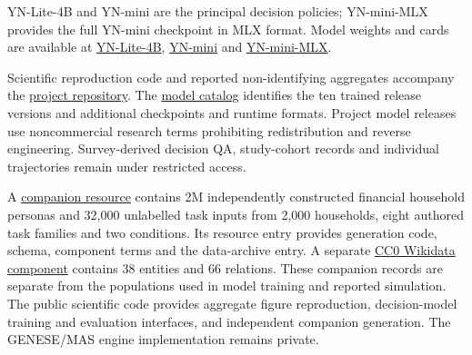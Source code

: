 \documentclass[10pt]{article}
\begin{document}
YN-Lite-4B and YN-mini are the principal decision policies; YN-mini-MLX provides the full YN-mini checkpoint in MLX format. Model weights and cards are available at \href{https://huggingface.co/ya9919/sharp-4b}{YN-Lite-4B}, \href{https://huggingface.co/ya9919/sharp-421m}{YN-mini} and \href{https://huggingface.co/ya9919/sharp-421m-mlx}{YN-mini-MLX}.


Scientific reproduction code and reported non-identifying aggregates accompany the \href{https://github.com/KataDavidXD/s2-mas}{project repository}. The \href{https://github.com/KataDavidXD/s2-mas/blob/main/resources/MODEL_CATALOG.md}{model catalog} identifies the ten trained release versions and additional checkpoints and runtime formats. Project model releases use noncommercial research terms prohibiting redistribution and reverse engineering. Survey-derived decision QA, study-cohort records and individual trajectories remain under restricted access.

A \href{https://github.com/KataDavidXD/s2-mas/tree/main/resources/public_companion}{companion resource} contains 2M independently constructed financial household personas and 32,000 unlabelled task inputs from 2,000 households, eight authored task families and two conditions. Its resource entry provides generation code, schema, component terms and the data-archive entry. A separate \href{https://github.com/KataDavidXD/s2-mas/tree/main/resources/wikidata}{CC0 Wikidata component} contains 38 entities and 66 relations. These companion records are separate from the populations used in model training and reported simulation. The public scientific code provides aggregate figure reproduction, decision-model training and evaluation interfaces, and independent companion generation. The GENESE/MAS engine implementation remains private.
\end{document}
